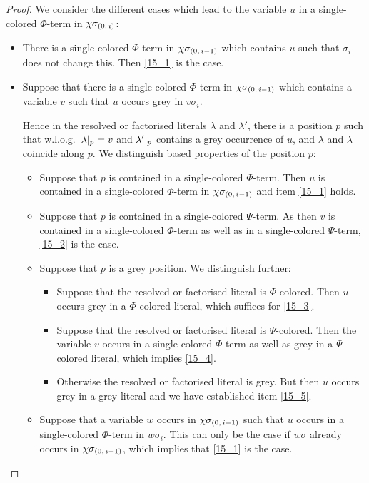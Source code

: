 \documentclass[,%
	draft=false,%
	numbers=noendperiod
	12pt,
	a4paper,
	oneside,%
	openany,
]{memoir}
\begin{document}
\begin{proof}
	We consider the different cases which lead to the variable $u$ in a single-colored $\Phi$-term in $\chi\sigma_{(0,\,i)}$:

	\begin{itemize}
		\item There is a single-colored $\Phi$-term in $\chi\sigma_{(0,\,i-1)}$ which contains $u$ such that $\sigma_i$ does not change this.
			Then \ref{15_1} is the case.

		\item Suppose that there is a single-colored $\Phi$-term in $\chi\sigma_{(0,\,i-1)}$ which contains a variable $v$ such that $u$ occurs grey in $v\sigma_i$.

			Hence in the resolved or factorised literals $\lambda$ and $\lambda'$, there is a position $p$ such that w.l.o.g.\ $\lambda|_{p} = v$ and $\lambda'|_{p}$ contains a grey occurrence of $u$, and $\lambda$ and $\lambda$ coincide along $p$.
			We distinguish based properties of the position $p$:

			\begin{itemize}
				\item Suppose that $p$ is contained in a single-colored $\Phi$-term.
					Then $u$ is contained in a single-colored $\Phi$-term in $\chi\sigma_{(0,\,i-1)}$ and item \ref{15_1} holds.

				\item Suppose that $p$ is contained in a single-colored $\Psi$-term.
					As then $v$ is contained in a single-colored $\Phi$-term as well as in a single-colored $\Psi$-term, \ref{15_2} is the case.

				\item Suppose that $p$ is a grey position.
					We distinguish further:

					\begin{itemize}
						\item Suppose that the resolved or factorised literal is $\Phi$-colored.
							Then $u$ occurs grey in a $\Phi$-colored literal, which suffices for \ref{15_3}. 

						\item Suppose that the resolved or factorised literal is $\Psi$-colored.
							Then the variable $v$ occurs in a single-colored $\Phi$-term as well as grey in a $\Psi$-colored literal, which implies \ref{15_4}.

						\item
							Otherwise the resolved or factorised literal is grey. 
							But then $u$ occurs grey in a grey literal and we have established item \ref{15_5}.
					\end{itemize}


				\item Suppose that a variable $w$ occurs in $\chi\sigma_{(0,\,i-1)}$ such that $u$ occurs in a single-colored $\Phi$-term in $w\sigma_i$.
					This can only be the case if $w\sigma$ already occurs in $\chi\sigma_{(0,\,i-1)}$, which implies that \ref{15_1} is the case.
					\qedhere
			\end{itemize}
	\end{itemize}

\end{proof}
\end{document}
